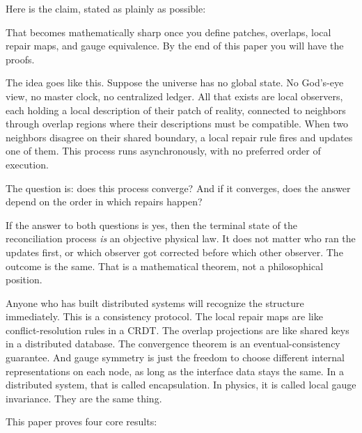 \documentclass[11pt]{article}
\begin{document}
Here is the claim, stated as plainly as possible:

\begin{center}
\end{center}

That becomes mathematically sharp once you define patches, overlaps, local repair maps, and gauge equivalence. By the end of this paper you will have the proofs.

The idea goes like this. Suppose the universe has no global state. No God's-eye view, no master clock, no centralized ledger. All that exists are local observers, each holding a local description of their patch of reality, connected to neighbors through overlap regions where their descriptions must be compatible. When two neighbors disagree on their shared boundary, a local repair rule fires and updates one of them. This process runs asynchronously, with no preferred order of execution.

The question is: does this process converge? And if it converges, does the answer depend on the order in which repairs happen?

If the answer to both questions is yes, then the terminal state of the reconciliation process \emph{is} an objective physical law. It does not matter who ran the updates first, or which observer got corrected before which other observer. The outcome is the same. That is a mathematical theorem, not a philosophical position.

Anyone who has built distributed systems will recognize the structure immediately. This is a consistency protocol. The local repair maps are like conflict-resolution rules in a CRDT. The overlap projections are like shared keys in a distributed database. The convergence theorem is an eventual-consistency guarantee. And gauge symmetry is just the freedom to choose different internal representations on each node, as long as the interface data stays the same. In a distributed system, that is called encapsulation. In physics, it is called local gauge invariance. They are the same thing.

This paper proves four core results:
\end{document}
